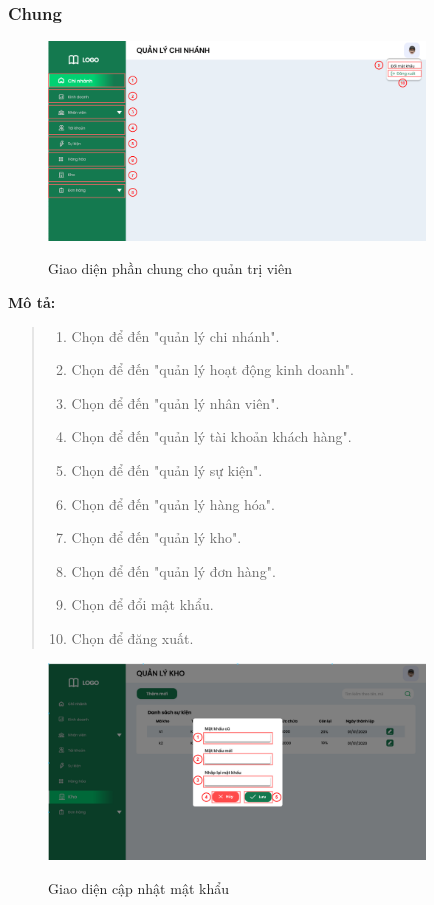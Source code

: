     \subsubsection{Chung}
        \begin{figure}[!htp]
            \centering
            \includegraphics[width=10cm]{img/UI/admin/sidebar.png}
            \label{17}
            \newline
            \caption{Giao diện phần chung cho quản trị viên}
        \end{figure}
        \textbf{Mô tả:}  
        \begin{quote}
            \begin{enumerate}
                \item Chọn để đến "quản lý chi nhánh".
                \item Chọn để đến "quản lý hoạt động kinh doanh".
                \item Chọn để đến "quản lý nhân viên".
                \item Chọn để đến "quản lý tài khoản khách hàng".
                \item Chọn để đến "quản lý sự kiện".
                \item Chọn để đến "quản lý hàng hóa".
                \item Chọn để đến "quản lý kho".
                \item Chọn để đến "quản lý đơn hàng".
                \item Chọn để đổi mật khẩu.
                \item Chọn để đăng xuất.
            \end{enumerate}
        \end{quote}
            \begin{figure}[!htp]
                \centering
                \includegraphics[width=10cm]{img/UI/admin/updatePassword.png}
                \label{18}
                \newline
                \caption{Giao diện cập nhật mật khẩu}
            \end{figure}
